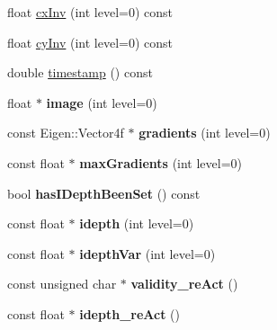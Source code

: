 \begin{DoxyCompactItemize}
\item 
float \hyperlink{classlsd__slam_1_1_frame_a4690556800b10f98c18a2fada62ae62b}{cx\-Inv} (int level=0) const 
\item 
float \hyperlink{classlsd__slam_1_1_frame_aae9fa687e7e515ba009a5fe5a617bf75}{cy\-Inv} (int level=0) const 
\item 
double \hyperlink{classlsd__slam_1_1_frame_a7124f3e1da6e9db387a3f89706225b47}{timestamp} () const 
\item 
\hypertarget{classlsd__slam_1_1_frame_a9306307027bbe62b973c0b138216b456}{float $\ast$ {\bfseries image} (int level=0)}\label{classlsd__slam_1_1_frame_a9306307027bbe62b973c0b138216b456}

\item 
\hypertarget{classlsd__slam_1_1_frame_a2c31baa0cea975fb73ccf80d92f7a5de}{const Eigen\-::\-Vector4f $\ast$ {\bfseries gradients} (int level=0)}\label{classlsd__slam_1_1_frame_a2c31baa0cea975fb73ccf80d92f7a5de}

\item 
\hypertarget{classlsd__slam_1_1_frame_a0b26845d846249e909e6ab0adc022ebf}{const float $\ast$ {\bfseries max\-Gradients} (int level=0)}\label{classlsd__slam_1_1_frame_a0b26845d846249e909e6ab0adc022ebf}

\item 
\hypertarget{classlsd__slam_1_1_frame_abe0ec6e93823ae0a31e73100a8b73940}{bool {\bfseries has\-I\-Depth\-Been\-Set} () const }\label{classlsd__slam_1_1_frame_abe0ec6e93823ae0a31e73100a8b73940}

\item 
\hypertarget{classlsd__slam_1_1_frame_ad78d873de1adfd4ab3268c50b1d462c7}{const float $\ast$ {\bfseries idepth} (int level=0)}\label{classlsd__slam_1_1_frame_ad78d873de1adfd4ab3268c50b1d462c7}

\item 
\hypertarget{classlsd__slam_1_1_frame_aa3fb7f275b5da621c039a6746b905770}{const float $\ast$ {\bfseries idepth\-Var} (int level=0)}\label{classlsd__slam_1_1_frame_aa3fb7f275b5da621c039a6746b905770}

\item 
\hypertarget{classlsd__slam_1_1_frame_a51cfb8cc35140eee3283021d97496db6}{const unsigned char $\ast$ {\bfseries validity\-\_\-re\-Act} ()}\label{classlsd__slam_1_1_frame_a51cfb8cc35140eee3283021d97496db6}

\item 
\hypertarget{classlsd__slam_1_1_frame_adac400f4b48f3d5ea20ee4ac8ea5ad8e}{const float $\ast$ {\bfseries idepth\-\_\-re\-Act} ()}\label{classlsd__slam_1_1_frame_adac400f4b48f3d5ea20ee4ac8ea5ad8e}


\end{DoxyCompactItemize}
